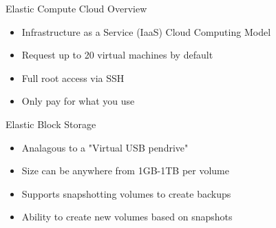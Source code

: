 \begin{frame}{Elastic Compute Cloud Overview}
\begin{itemize}
  \item Infrastructure as a Service (IaaS) Cloud Computing Model
  \item Request up to 20 virtual machines by default
  \item Full root access via SSH
  \item Only pay for what you use
\end{itemize}
\end{frame}

\begin{frame}{Elastic Block Storage}
    \begin{itemize}
        \item Analagous to a "Virtual USB pendrive"
        \item Size can be anywhere from 1GB-1TB per volume
        \item Supports snapshotting volumes to create backups
        \item Ability to create new volumes based on snapshots
    \end{itemize}
\end{frame}

